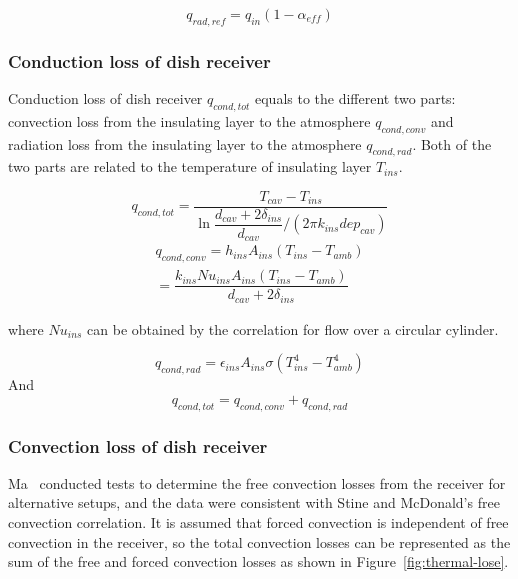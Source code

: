 \documentclass{article}
\begin{document}
\begin{equation*}
	q_{rad,ref}=q_{in}(1-\alpha_{eff})
\end{equation*}

\subsubsection{Conduction loss of dish receiver}
Conduction loss of dish receiver $q_{cond,tot}$ equals to the different two parts: convection loss from the insulating layer to the atmosphere $q_{cond,conv}$ and radiation loss from the insulating layer to the atmosphere $q_{cond,rad}$. Both of the two parts are related to the temperature of insulating layer $T_{ins}$.

\begin{equation*}
	q_{cond,tot}=\dfrac{T_{cav}-T_{ins}}{\ln\dfrac{d_{cav}+2\delta_{ins}}{d_{cav}}/(2\pi{}k_{ins}dep_{cav})}
\end{equation*}
\begin{equation*}
\begin{split}
	q_{cond,conv}=h_{ins}A_{ins}(T_{ins}-T_{amb})
	\\=\dfrac{k_{ins}Nu_{ins}A_{ins}(T_{ins}-T_{amb})}{d_{cav}+2\delta_{ins}}
\end{split}
\end{equation*}

where $Nu_{ins}$ can be obtained by the correlation for flow over a circular cylinder.~\cite{Churchill1977} 

\begin{equation*}
	q_{cond,rad}=\epsilon_{ins}A_{ins}\sigma(T_{ins}^4 - T_{amb}^4)	
\end{equation*}
And 
\begin{equation*}
	q_{cond,tot}=q_{cond,conv}+q_{cond,rad}	
\end{equation*}

\subsubsection{Convection loss of dish receiver}
Ma~\cite{Ma1993} conducted tests to determine the free convection losses from the receiver for alternative setups, and the data were consistent with Stine and McDonald's free convection correlation. It is assumed that forced convection is independent of free convection in the receiver, so the total convection losses can be represented as the sum of the free and forced convection losses as shown in Figure~\ref{fig:thermal-lose}.
\end{document}
